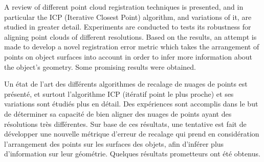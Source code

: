 \newenvironment{abstract2}{
  \vspace*{\fill}
  \begin{center}%
    \bfseries\abstractname
  \end{center}}%
  {\vfill}


\begin{abstract2}
A review of different point cloud registration techniques is presented, and in particular the ICP (Iterative Closest Point) algorithm, and variations of it, are studied in greater detail. Experiments are conducted to tests its robustness for aligning point clouds of different resolutions. Based on the results, an attempt is made to develop a novel registration error metric which takes the arrangement of points on object surfaces into account in order to infer more information about the object's geometry. Some promising results were obtained.
\end{abstract2}

\begin{abstract2}
Un état de l'art des différents algorithmes de recalage de nuages de points est présenté, et surtout l'algorithme ICP (itératif point le plus proche) et ses variations sont étudiés plus en détail. Des expériences sont accomplis dans le but de déterminer sa capacité de bien aligner des nuages de points ayant des résolutions très différentes. Sur base de ces résultats, une tentative est fait de développer une nouvelle métrique d'erreur de recalage qui prend en considération l'arrangement des points sur les surfaces des objets, afin d'inférer plus d'information sur leur géométrie. Quelques résultats prometteurs ont été obtenus.
\end{abstract2}

\clearpage
